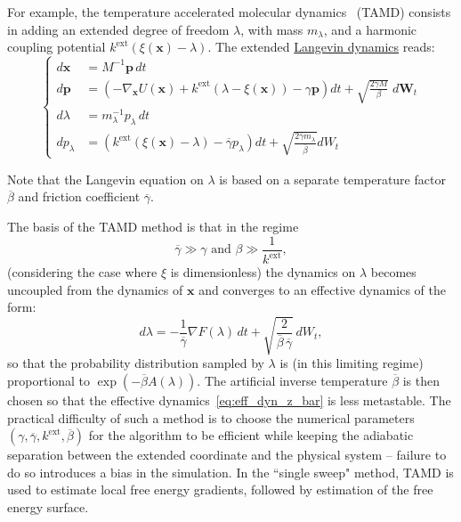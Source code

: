 \documentclass[9pt,review]{livecoms}
\newcommand{\vx}{\mathbf{x}}
\newcommand{\vp}{\mathbf{p}}
\begin{document}
For example, the temperature accelerated molecular dynamics~\cite{MV06} (TAMD) consists in adding an extended degree of freedom $\lambda$, with mass $m_\lambda$, and a harmonic coupling potential $k^\mathrm{ext} \left( \xi(\vx) - \lambda \right)$.
The extended \hyperlink{ref:Langevin} {Langevin dynamics} reads:
\begin{equation}
\left\{
\begin{array}{ll}
    d\vx &= M^{-1} \vp \,  dt \\
    d\vp &= \left(-\nabla_\vx U(\vx) + k^\mathrm{ext} ( \lambda -\xi(\vx)) - \gamma \vp \right) dt
    + \sqrt{ \frac{2 \gamma M}{\beta}} \; d\mathbf{W}_t \\
    d\lambda &= m_\lambda^{-1} p_\lambda \, dt\\
    d p_\lambda &= \left( k^\mathrm{ext} (\xi(\vx) - \lambda)  - \overline\gamma p_\lambda \right) dt
    + \sqrt{ \frac{2 \bar\gamma m_\lambda}{ \overline\beta}} dW_t
\end{array}
\right.
\end{equation}

Note that the Langevin equation on $\lambda$ is based on a separate temperature factor $\overline \beta$ and friction coefficient $\overline{\gamma}$.

The basis of the TAMD method is that in the regime
\begin{equation}
\overline{\gamma} \gg \gamma \text{ and }\beta \gg \frac{1}{k^\mathrm{ext}},
\end{equation}
(considering the case where $\xi$ is dimensionless) the dynamics on $\lambda$ becomes uncoupled from the dynamics of $\vx$ and converges to an effective dynamics of the form:
\begin{equation}\label{eq:eff_dyn_z_bar}
d\lambda = - \frac{1}{\overline{\gamma}} \nabla F (\lambda) \, dt + \sqrt{ \frac{2}{\overline{\beta} \, \overline{\gamma}}} \, dW_t,
\end{equation}
so that the probability distribution sampled by $\lambda$ is (in this limiting regime) proportional to $\exp(- \overline{\beta} A(\lambda))$. The artificial inverse temperature $\overline{\beta}$ is then chosen so that the effective dynamics~\eqref{eq:eff_dyn_z_bar} is less metastable.
The practical difficulty of such a method is to choose the numerical parameters $(\gamma,\overline{\gamma},k^\mathrm{ext},\overline{\beta})$ for the algorithm to be efficient while keeping the adiabatic separation between the extended coordinate and the physical system -- failure to do so introduces a bias in the simulation.
In the ``single sweep" method, TAMD is used to estimate local free energy gradients, followed by estimation of the free energy surface.\cite{Maragliano2008} 
\end{document}
